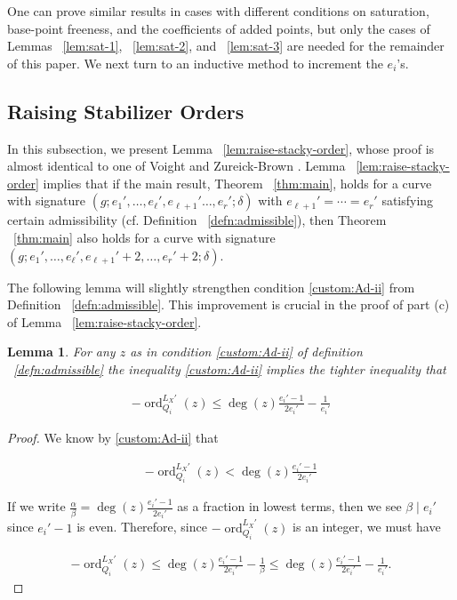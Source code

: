 \documentclass{amsart}
\theoremstyle{plain}
\newtheorem{lem}[thm]{Lemma}
\theoremstyle{definition}
\theoremstyle{remark}
\numberwithin{equation}{section}
\newcommand\ssec{\subsection}
\DeclareMathOperator{\ord}{ord}
\newcommand \subhalf[1]{\frac{{#1} - 1}{2{#1}}}
\newcommand{\halfcan}{L}
\begin{document}
One can prove similar results in cases with different conditions on saturation, base-point freeness, and the coefficients of added points, but only the cases of Lemmas ~\ref{lem:sat-1}, ~\ref{lem:sat-2}, and ~\ref{lem:sat-3} are needed for the remainder of this paper.  We next turn to an inductive method to increment the $e_i$'s.

\ssec{Raising Stabilizer Orders}
\label{ssec:raise-orders}
In this subsection, we present Lemma ~\ref{lem:raise-stacky-order},
whose proof is almost identical to one of Voight and Zureick-Brown
\cite[Theorem 8.5.7]{vzb:stacky}. Lemma
~\ref{lem:raise-stacky-order} implies that if the main result,
Theorem ~\ref{thm:main}, holds for a curve with signature $(g; e_1',
\ldots, e_\ell', e_{\ell + 1}' \ldots, e_r';\delta)$ with $e_{\ell + 1}' =
\cdots = e_r'$ satisfying certain admissibility (cf. Definition
~\ref{defn:admissible}), then Theorem ~\ref{thm:main} also holds for
a curve with signature $(g; e_1', \ldots, e_\ell', e_{\ell + 1}' + 2,
\ldots, e_r' + 2; \delta)$. 

The following lemma will slightly strengthen condition \ref{custom:Ad-ii} from Definition ~\ref{defn:admissible}. This improvement is crucial in the proof of part (c) of Lemma ~\ref{lem:raise-stacky-order}.

\begin{lem}
\label{lem:admissible_inequality}
For any $z$ as in condition \ref{custom:Ad-ii} of definition ~\ref{defn:admissible} the inequality \ref{custom:Ad-ii} implies the
tighter inequality that

\begin{align*}
	-\ord_{Q_i}
^{\halfcan_X'}(z) \leq \deg(z) \subhalf{e_i'} -\frac{1}{e_i'}
\end{align*}
\end{lem}

\begin{proof}
We know by \ref{custom:Ad-ii} that

\begin{align*}
	-\ord_{Q_i}
^{\halfcan_X'}(z) < \deg(z) \subhalf{e_i'}
\end{align*}

\noindent
If we write $\frac{\alpha}{\beta} = \deg(z) \frac{e_i'- 1}{2e_i'}$ 
as a fraction in lowest terms, then we see $\beta \mid e_i'$ since $
e_i'- 1$ is even. Therefore, since $-\ord_{Q_i}
^{\halfcan_X'}(z)$ is an integer, 
we must have

\begin{align*}
	-\ord_{Q_i}
^{\halfcan_X'}(z) \leq \deg(z) \subhalf{e_i'} - \frac{1}{\beta} \leq 
	\deg(z) \subhalf{e_i'} - \frac{1}{e_i'}.
\end{align*}
\end{proof}
\end{document}
